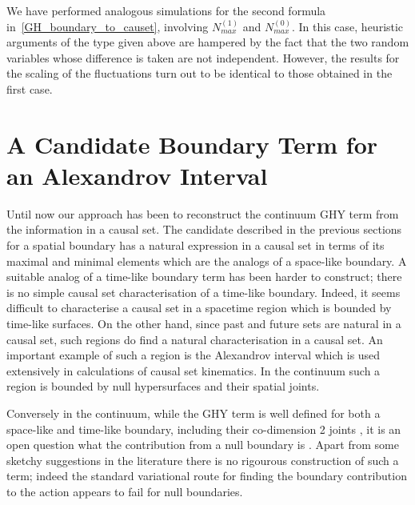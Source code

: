 \documentclass[12pt]{article}
\begin{document}
We have performed analogous simulations for the second formula in~\eqref{GH_boundary_to_causet}, involving $N^{(1)}_{max}$ and $N^{(0)}_{max}$. In this case, heuristic arguments of the type given above are hampered by the fact that the two random variables whose difference is taken are not independent. However, the results for the scaling of the fluctuations turn out to be identical to those obtained in the first case. 

\section{A Candidate Boundary Term for an Alexandrov Interval}


Until now our approach has been to reconstruct the  continuum GHY term  from the information in a causal set. 
The candidate described in the previous sections for a spatial boundary has a natural expression in a causal set  in  terms of its maximal and minimal elements which are the  analogs of a  space-like boundary.  A suitable analog  of  a time-like boundary  term has been harder to  construct; there is no simple causal set  characterisation of a time-like boundary. Indeed, it seems difficult to characterise a causal set in a  spacetime region which is bounded by time-like surfaces. On the other hand, since past and future sets are natural in a causal set, such regions do find a natural characterisation in a causal set. An important example of such a region is the  Alexandrov interval which is used extensively  in calculations of causal set kinematics.  In the continuum such a region  is bounded by null hypersurfaces and their spatial joints.  

Conversely in the continuum,   while the GHY term  is well defined for both a space-like and time-like boundary,  including their co-dimension 2 joints \cite{harris},  it is an open question what the contribution from a null  boundary  is \cite{ghh}. Apart from some sketchy suggestions in the literature \cite{neiman} there is no rigourous construction of such a term; indeed the standard variational route for finding the boundary contribution to the action appears to fail for null boundaries. 
\end{document}
